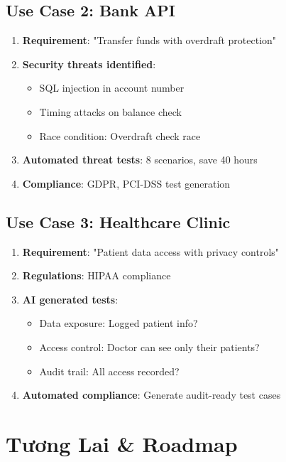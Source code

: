 \documentclass[12pt,a4paper]{report}
\begin{document}
\section{Use Case 2: Bank API}

\begin{enumerate}
    \item \textbf{Requirement}: "Transfer funds with overdraft protection"
    \item \textbf{Security threats identified}:
    \begin{itemize}
        \item SQL injection in account number
        \item Timing attacks on balance check
        \item Race condition: Overdraft check race
    \end{itemize}
    \item \textbf{Automated threat tests}: 8 scenarios, save 40 hours
    \item \textbf{Compliance}: GDPR, PCI-DSS test generation
\end{enumerate}

\section{Use Case 3: Healthcare Clinic}

\begin{enumerate}
    \item \textbf{Requirement}: "Patient data access with privacy controls"
    \item \textbf{Regulations}: HIPAA compliance
    \item \textbf{AI generated tests}:
    \begin{itemize}
        \item Data exposure: Logged patient info?
        \item Access control: Doctor can see only their patients?
        \item Audit trail: All access recorded?
    \end{itemize}
    \item \textbf{Automated compliance}: Generate audit-ready test cases
\end{enumerate}

\chapter{Tương Lai & Roadmap}
\end{document}
